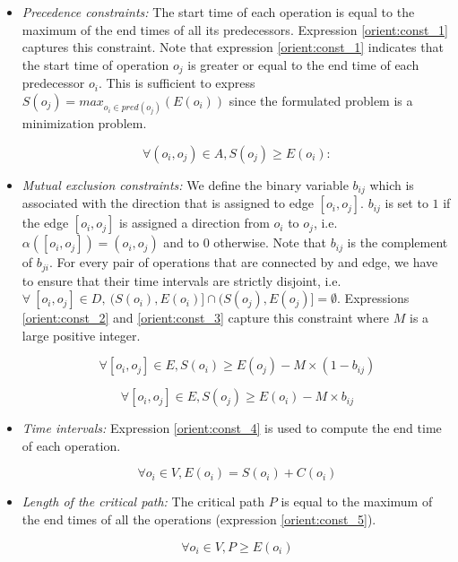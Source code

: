 \begin{itemize}

\item \textit{Precedence constraints:} The start time of each operation is equal to the maximum of the end times of all its predecessors. Expression \ref{orient:const_1} captures this constraint. Note that expression \ref{orient:const_1} indicates that the start time of operation $o_j$ is greater or equal to the end time of each predecessor $o_i$. This is sufficient to express $S(o_j) = max_{o_i \in pred(o_j)}(E(o_i))$ since the formulated problem is a minimization problem.

\begin{equation}
\forall (o_i,o_j) \in A, S(o_j) \geq E(o_i):
\label{orient:const_1}
\end{equation}

\item \textit{Mutual exclusion constraints:} We define the binary variable $b_{ij}$ which is associated with the direction that is assigned to edge $[o_i,o_j]$. $b_{ij}$ is set to $1$ if the edge $[o_i,o_j]$ is assigned a direction from $o_i$ to $o_j$, i.e. $\alpha([o_i,o_j]) = (o_i,o_j)$ and to $0$ otherwise. Note that $b_{ij}$ is the complement of $b_{ji}$. For every pair of operations that are connected by and edge, we have to ensure that their time intervals are strictly disjoint, i.e. $\forall\ [o_i,o_j] \in D,\  (S(o_i), E(o_i)] \cap (S(o_j), E(o_j)] = \emptyset$. Expressions \ref{orient:const_2} and \ref{orient:const_3} capture this constraint where $M$ is a large positive integer.

\begin{equation}
\forall [o_i,o_j] \in E, S(o_i) \geq E(o_j) - M \times (1-b_{ij})
\label{orient:const_2}
\end{equation} 

\begin{equation}
\forall [o_i,o_j] \in E, S(o_j) \geq E(o_i) - M \times b_{ij}
\label{orient:const_3}
\end{equation}

\item \textit{Time intervals:} Expression \ref{orient:const_4} is used to compute the end time of each operation.

\begin{equation}
\forall o_i \in V, E(o_i) = S(o_i) + C(o_i)
\label{orient:const_4}
\end{equation} 

\item \textit{Length of the critical path:} The critical path $P$ is equal to the maximum of the end times of all the operations (expression \ref{orient:const_5}).

\begin{equation}
\forall o_i \in V, P \geq E(o_i)
\label{orient:const_5}
\end{equation}

\end{itemize}

